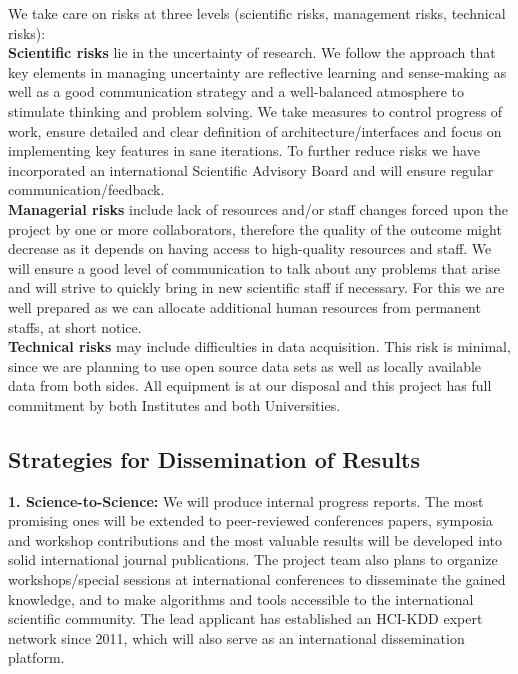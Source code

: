 \documentclass[a4paper,11pt]{article}
\begin{document}
We take care on risks at three levels (scientific risks, management risks, technical risks):
\\[0,2cm]
\textbf{Scientific risks} lie in the uncertainty of research. We follow the approach that key elements in managing uncertainty are reflective learning and sense-making as well as a good communication strategy and a well-balanced atmosphere to stimulate thinking and problem solving. 
We take measures to control progress of work, ensure detailed and clear definition of architecture/interfaces and focus on implementing key features in sane iterations. To further reduce risks we have incorporated an international Scientific Advisory Board and will ensure regular communication/feedback. 
\\[0,2cm]
\textbf{Managerial risks} include lack of resources and/or staff changes forced upon the project by one or more collaborators, therefore the quality of the outcome might decrease as it depends on having access to high-quality resources and staff. We will ensure a good level of communication to talk about any problems that arise and will strive to quickly bring in new scientific staff if necessary. For this we are well prepared as we can allocate additional human resources from permanent staffs, at short notice.
\\[0,2cm]
\textbf{Technical risks} may include difficulties in data acquisition. This risk is minimal, since we are planning to use open source data sets as well as locally available data from both sides. All equipment is at our disposal and this project has full commitment by both Institutes and both Universities. 

\subsection{Strategies for Dissemination of Results}

\textbf{1. Science-to-Science:} We will produce internal progress reports. The most promising ones will be extended to peer-reviewed conferences papers, symposia and workshop contributions and the most valuable results will be developed into solid international journal publications. The project team also plans to organize workshops/special sessions at international conferences to disseminate the gained knowledge, and to make algorithms and tools accessible to the international scientific community. The lead applicant has established an HCI-KDD expert network since 2011, which will also serve as an international dissemination platform.
\end{document}
